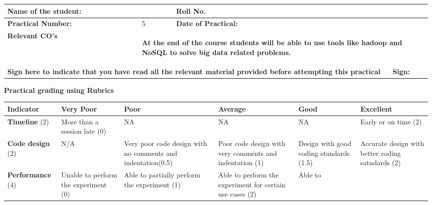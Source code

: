 \documentclass[11pt,article]{memoir}
\begin{document}
\sloppy
\fancypage{\doublebox}{}
\begin{flushleft}


    \begin{tabular}{ | p{4cm} | p{5cm} | p{3.5cm} | p{2cm} |}
    \hline

    \textbf{Name of the student:}& &\textbf{Roll No.} & \\ \hline
    \textbf{Practical Number:}& 5 & \textbf{Date of Practical:} & \\ \hline
	\textbf{Relevant CO's} & \multicolumn{3}{|p{10.5cm}|}{\begin{flushleft}
	\textbf{At the end of the course students will be able to use tools like hadoop and NoSQL to solve big data related problems.}
	\end{flushleft}}\\
    \hline
    \multicolumn{3}{|p{12.5cm}|}{\textbf{Sign here to indicate that you have read all the relevant material provided before attempting this practical}}& \textbf{Sign:}\\ \hline
    \end{tabular}
    \vspace{1cm}
        \textbf{Practical grading using Rubrics}
           \begin{tabular}{|p{2cm}|p{2cm}|p{2cm}|p{2cm}|p{2cm}|p{2cm}|}
                             \hline \textbf{Indicator} & \textbf{Very Poor} & \textbf{Poor} & \textbf{Average} & \textbf{Good} & \textbf{Excellent} \\ 
                             \hline \textbf{Timeline} (2) & More than a session late (0) & NA  & NA  & NA  & Early or on time (2) \\ 
                             \hline \textbf{Code design} (2) & N/A & Very poor code design with no comments and indentation(0.5) & Poor code design with very comments and indentation
                             (1) & Design with good coding standards (1.5) & Accurate design with better coding satndards (2) \\ 
                             \hline \textbf{Performance} (4) & Unable to
                             perform the
                             experiment
                             (0) & Able to
                             partially
                             perform the
                             experiment
                             (1)
                              & Able to
                              perform the
                              experiment
                              for certain use
                              cases (2) & Able to

\end{tabular}
\end{flushleft}
\end{document}
